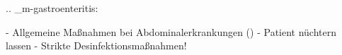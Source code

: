 %

.. _m-gastroenteritis:

\begin{itemize}
  -   Allgemeine Maßnahmen bei Abdominalerkrankungen
  ()
  -   Patient nüchtern lassen
  -   Strikte Desinfektionsmaßnahmen!
\end{itemize}